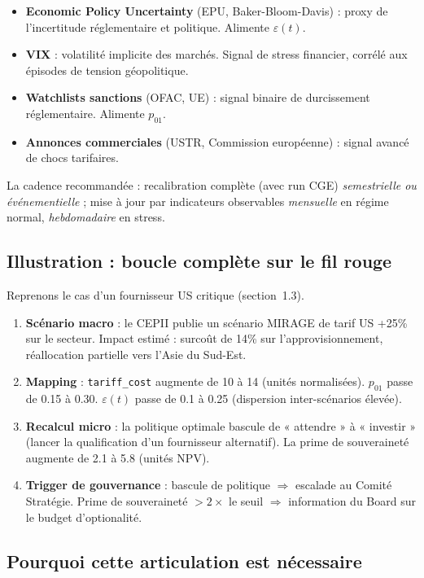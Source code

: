 \documentclass[11pt,a4paper]{article}
\begin{document}
\begin{itemize}
\item \textbf{Economic Policy Uncertainty} (EPU, Baker-Bloom-Davis) : proxy de l’incertitude réglementaire et politique. Alimente \(\varepsilon(t)\).
\item \textbf{VIX} : volatilité implicite des marchés. Signal de stress financier, corrélé aux épisodes de tension géopolitique.
\item \textbf{Watchlists sanctions} (OFAC, UE) : signal binaire de durcissement réglementaire. Alimente \(p_{01}\).
\item \textbf{Annonces commerciales} (USTR, Commission européenne) : signal avancé de chocs tarifaires.
\end{itemize}

La cadence recommandée : recalibration complète (avec run CGE) \emph{semestrielle ou événementielle} ; mise à jour par indicateurs observables \emph{mensuelle} en régime normal, \emph{hebdomadaire} en stress.

\subsection{Illustration : boucle complète sur le fil rouge}

Reprenons le cas d’un fournisseur US critique (section~1.3).

\begin{enumerate}
\item \textbf{Scénario macro} : le CEPII publie un scénario MIRAGE de tarif US +25\% sur le secteur. Impact estimé : surcoût de 14\% sur l’approvisionnement, réallocation partielle vers l’Asie du Sud-Est.
\item \textbf{Mapping} : \texttt{tariff\_cost} augmente de 10 à 14 (unités normalisées). \(p_{01}\) passe de 0.15 à 0.30. \(\varepsilon(t)\) passe de 0.1 à 0.25 (dispersion inter-scénarios élevée).
\item \textbf{Recalcul micro} : la politique optimale bascule de « attendre » à « investir » (lancer la qualification d’un fournisseur alternatif). La prime de souveraineté augmente de 2.1 à 5.8 (unités NPV).
\item \textbf{Trigger de gouvernance} : bascule de politique \(\Rightarrow\) escalade au Comité Stratégie. Prime de souveraineté \(> 2\times\) le seuil \(\Rightarrow\) information du Board sur le budget d’optionalité.
\end{enumerate}

\subsection{Pourquoi cette articulation est nécessaire}
\end{document}
